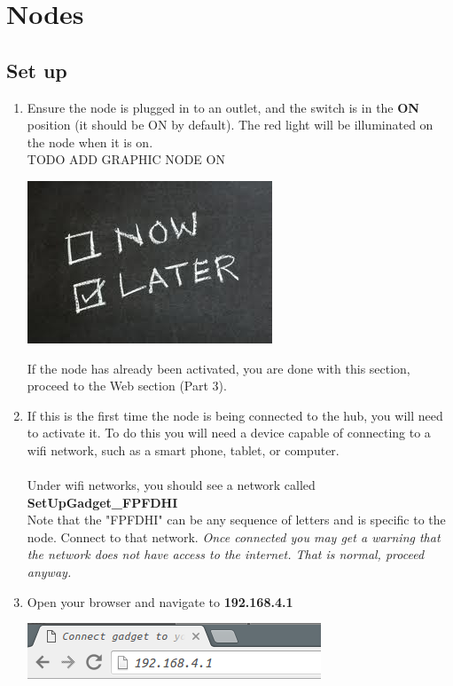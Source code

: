   \section{Nodes}
  \subsection{Set up}
    \begin{enumerate}
      \item Ensure the node is plugged in to an outlet, and the switch is in the \textbf{ON} position 
      (it should be ON by default).
      The red light will be illuminated on the node when it is on.\\ 
TODO ADD GRAPHIC NODE ON\\
      \begin{center}
      \includegraphics[scale=1]{images/Now-Later.png}
    \end{center}

      If the node has already been activated, you are done with this section, proceed to the Web section (Part 3).

      \item If this is the first time the node is being connected to the hub,
      you will need to activate it. To do this you will need a device
      capable of connecting to a wifi network, such as a smart phone, tablet, or computer.\\
      \\ 
      Under wifi networks, you should see a network called \textbf{SetUpGadget\_FPFDHI}\\
      Note that the "FPFDHI" can be any sequence of letters and is specific to the node. Connect to that network. 
      \emph{Once connected you may get a warning that the network does not have access
      to the internet. That is normal, proceed anyway.}

      \item Open your browser and navigate to \textbf{192.168.4.1}

      \begin{center}
      \includegraphics[scale=1]{images/ip-enter.png}
    \end{center}  


\end{enumerate}

